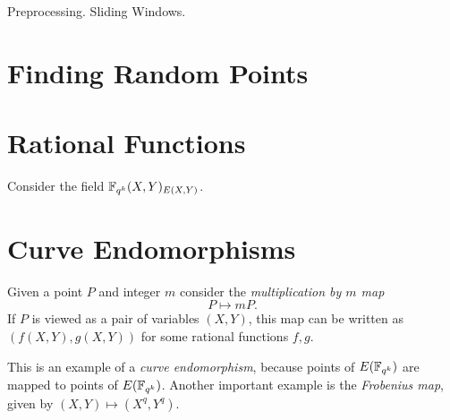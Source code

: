Preprocessing. Sliding Windows.

\section {Finding Random Points}

\section {Rational Functions}

Consider the field $\mathbb{F}_{q^k}(X,Y)_{E(X,Y)}$.

\section {Curve Endomorphisms}

Given a point $P$ and integer $m$ consider the \emph{multiplication by $m$ map}
\[ P \mapsto m P . \]
If $P$ is viewed as a pair of variables $(X,Y)$, this map
can be written as $(f(X,Y), g(X,Y))$ for some rational functions $f,g$.

This is an example of a \emph{curve endomorphism}, because points of
$E(\mathbb{F}_{q^k})$ are mapped to points of $E(\mathbb{F}_{q^k})$. Another important example
is the \emph{Frobenius map}, given by $(X, Y) \mapsto (X^q, Y^q)$.
